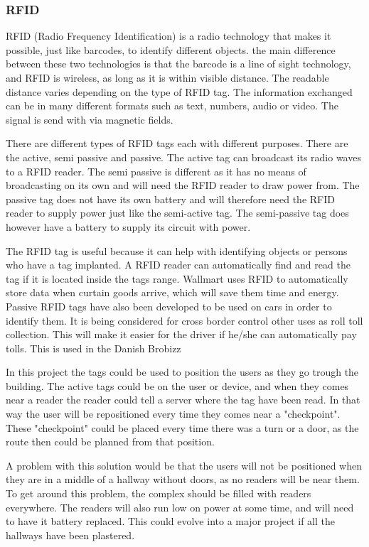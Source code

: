 \subsubsection{RFID}

RFID (Radio Frequency Identification) is a radio technology that makes it possible, just like barcodes, to identify different objects. the main difference between these two technologies is that the barcode is a line of sight technology, and RFID is wireless, as long as it is within visible distance. The readable distance varies depending on the type of RFID tag. The information exchanged can be in many different formats such as text, numbers, audio or video. The signal is send with via magnetic fields\cite{RFID_magnetic}.

There are different types of RFID tags each with different purposes. There are the active, semi passive and passive. The active tag can broadcast its radio waves to a RFID reader. The semi passive is different as it has no means of broadcasting on its own and will need the RFID reader to draw power from\cite{RFID_semiActive}. The passive tag does not have its own battery and will therefore need the RFID reader to supply power just like the semi-active tag. The semi-passive tag does however have a battery to supply its circuit with power\cite{RFID_AllTypes}.

The RFID tag is useful because it can help with identifying objects or persons who have a tag implanted\cite{RFID_FAQ}. A RFID reader can automatically find and read the tag if it is located inside the tags range. Wallmart uses RFID to automatically store data when curtain goods arrive, which will save them time and energy\cite{RFiD_inc}. Passive RFID tags have also been developed to be used on cars in order to identify them. It is being considered for cross border control other uses as roll toll collection\cite{RFID_car}. This will make it easier for the driver if he/she can automatically pay tolls. This is used in the Danish Brobizz\cite{RFID_brobizz}   

In this project the tags could be used to position the users as they go trough the building. The active tags could be on the user or device, and when they comes near a reader the reader could tell a server where the tag have been read. In that way the user will be repositioned every time they comes near a "checkpoint". These "checkpoint" could be placed every time there was a turn or a door, as the route then could be planned from that position.

A problem with this solution would be that the users will not be positioned when they are in a middle of a hallway without doors, as no readers will be near them. To get around this problem, the complex should be filled with readers everywhere. The readers will also run low on power at some time, and will need to have it battery replaced. This could evolve into a major project if all the hallways have been plastered.


